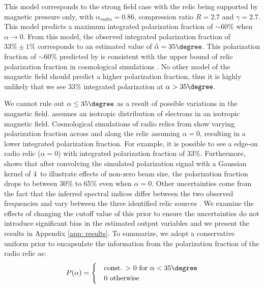 This model corresponds to the strong field case with the relic being supported by
magnetic pressure only, with $\alpha_{radio} = 0.86$, compression ratio
$R=2.7$ and $\gamma = 2.7$. 
This model predicts a maximum integrated polarization fraction of
$\sim60\%$ when $\alpha \rightarrow 0$. From this model, the observed integrated
polarization fraction of $33\%\pm1\%$ corresponds to an estimated value
of $\hat{\alpha}
 = 35\degree$. 
This  polarization fraction of $\sim 60\%$ predicted by \citep{E98} is
consistent with the upper bound of relic polarization fraction in cosmological
simulations \citep{S13}. No other model of the magnetic field should predict a higher polarization fraction, thus it is highly unlikely that we see 33\%
integrated polarization at $\alpha > 35\degree$.  
\par

We cannot rule out $\alpha \leq 35\degree$ as a result of possible
variations in the magnetic field. 
\cite{E98} assumes an isotropic distribution of electrons in an isotropic magnetic field. Cosmological
simulations of radio relics from \cite{S13} show varying polarization
fraction across and along the relic assuming $\alpha = 0$, resulting in a
lower integrated polarization fraction. For example, it is possible to see a edge-on radio relic ($\alpha = 0$) with integrated polarization fraction of 33\%. 
Furthermore, \cite{S13} shows that after convolving the
simulated polarization signal with a Gaussian kernel of 4\arcmin~to
illustrate effects of non-zero beam size, the polarization fraction drops to between 30\% to
65\% even when $\alpha = 0$. 
Other uncertainties come from the fact that the inferred spectral indices
differ between the two observed frequencies and vary between the three
identified relic sources \citep{L13}. We examine the effects  of changing
the cutoff value of this prior to ensure the uncertainties do not
introduce significant bias in the estimated output variables and we
present the results in Appendix \ref{app: results}.
To summarize, we adopt a conservative uniform prior to encapsulate the
information from the polarization fraction of the radio relic as:
\begin{equation}
P(\alpha) = 
	\begin{cases}
	& \text{const. $>$ 0 for  }\alpha < 35 \degree \\ 
	& 0 \text{ otherwise}\label{eqn: polarprior}
	\end{cases}
\end{equation}

